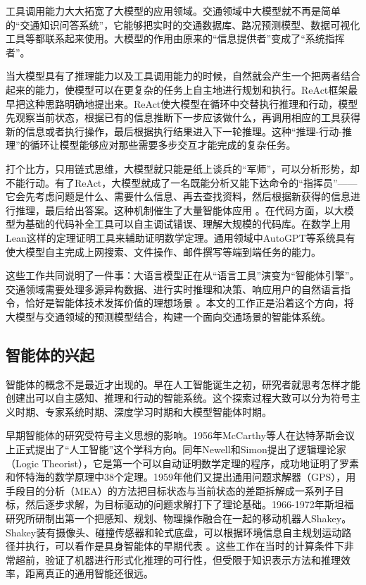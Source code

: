 工具调用能力大大拓宽了大模型的应用领域。交通领域中大模型就不再是简单的“交通知识问答系统”，它能够把实时的交通数据库、路况预测模型、数据可视化工具等都联系起来使用。大模型的作用由原来的“信息提供者”变成了“系统指挥者”。

当大模型具有了推理能力以及工具调用能力的时候，自然就会产生一个把两者结合起来的能力，使模型可以在更复杂的任务上自主地进行规划和执行。ReAct框架最早把这种思路明确地提出来。ReAct使大模型在循环中交替执行推理和行动，模型先观察当前状态，根据已有的信息推断下一步应该做什么，再调用相应的工具获得新的信息或者执行操作，最后根据执行结果进入下一轮推理。这种“推理-行动-推理”的循环让模型能够应对那些需要多步交互才能完成的复杂任务。

打个比方，只用链式思维，大模型就只能是纸上谈兵的“军师”，可以分析形势，却不能行动。有了ReAct，大模型就成了一名既能分析又能下达命令的“指挥员”——它会先考虑问题是什么、需要什么信息、再去查找资料，然后根据新获得的信息进行推理，最后给出答案。这种机制催生了大量智能体应用 。在代码方面，以大模型为基础的代码补全工具可以自主调试错误、理解大规模的代码库。在数学上用Lean这样的定理证明工具来辅助证明数学定理。通用领域中AutoGPT等系统具有使大模型自主完成上网搜索、文件操作、邮件撰写等端到端任务的能力。

这些工作共同说明了一件事：大语言模型正在从“语言工具”演变为“智能体引擎”。交通领域需要处理多源异构数据、进行实时推理和决策、响应用户的自然语言指令，恰好是智能体技术发挥价值的理想场景 。本文的工作正是沿着这个方向，将大模型与交通领域的预测模型结合，构建一个面向交通场景的智能体系统。

\subsection{智能体的兴起}

智能体的概念不是最近才出现的。早在人工智能诞生之初，研究者就思考怎样才能创建出可以自主感知、推理和行动的智能系统。这个探索过程大致可以分为符号主义时期、专家系统时期、深度学习时期和大模型智能体时期。

早期智能体的研究受符号主义思想的影响。1956年McCarthy等人在达特茅斯会议上正式提出了“人工智能”这个学科方向。同年Newell和Simon提出了逻辑理论家（Logic Theorist），它是第一个可以自动证明数学定理的程序，成功地证明了罗素和怀特海的数学原理中38个定理。1959年他们又提出通用问题求解器（GPS），用手段目的分析（MEA）的方法把目标状态与当前状态的差距拆解成一系列子目标，然后逐步求解，为目标驱动的问题求解打下了理论基础。1966-1972年斯坦福研究所研制出第一个把感知、规划、物理操作融合在一起的移动机器人Shakey。Shakey装有摄像头、碰撞传感器和轮式底盘，可以根据环境信息自主规划运动路径并执行，可以看作是具身智能体的早期代表 。这些工作在当时的计算条件下非常超前，验证了机器进行形式化推理的可行性，但受限于知识表示方法和推理效率，距离真正的通用智能还很远。


